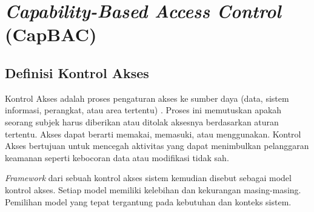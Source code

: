 \section{\textit{Capability-Based Access Control} (CapBAC)}
\label{sec:capbac}

\subsection{Definisi Kontrol Akses}
\label{subsec:definisi-kontrol-akses}
Kontrol Akses adalah proses pengaturan akses ke sumber daya (data, sistem informasi, perangkat, atau area tertentu) \autocite{sandhu1994access, li2022capability}. Proses ini memutuskan apakah seorang subjek harus diberikan atau ditolak aksesnya berdasarkan aturan tertentu. Akses dapat berarti memakai, memasuki, atau menggunakan. Kontrol Akses bertujuan untuk mencegah aktivitas yang dapat menimbulkan pelanggaran keamanan seperti kebocoran data atau modifikasi tidak sah.

\textit{Framework} dari sebuah kontrol akses sistem kemudian disebut sebagai model kontrol akses. Setiap model memiliki kelebihan dan kekurangan masing-masing. Pemilihan model yang tepat tergantung pada kebutuhan dan konteks sistem.



